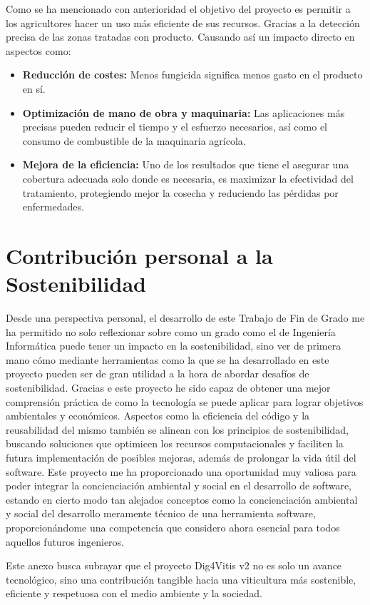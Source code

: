 Como se ha mencionado con anterioridad el objetivo del proyecto es permitir a los agricultores hacer un uso más eficiente de sus recursos. Gracias a la detección precisa de las zonas tratadas con producto.
Causando así un impacto directo en aspectos como:
\begin{itemize}
    \item \textbf{Reducción de costes:} Menos fungicida significa menos gasto en el producto en sí.
    \item \textbf{Optimización de mano de obra y maquinaria:} Las aplicaciones más precisas pueden reducir el tiempo y el esfuerzo necesarios, así como el consumo de combustible de la maquinaria agrícola.
    \item \textbf{Mejora de la eficiencia:} Uno de los resultados que tiene el asegurar una cobertura adecuada solo donde es necesaria, es maximizar la efectividad del tratamiento, protegiendo mejor la cosecha y reduciendo las pérdidas por enfermedades.
\end{itemize}

\section{Contribución personal a la Sostenibilidad}

Desde una perspectiva personal, el desarrollo de este Trabajo de Fin de Grado me ha permitido no solo reflexionar sobre como un grado como el de Ingeniería Informática puede tener un impacto en la sostenibilidad, sino ver de primera mano cómo mediante herramientas como la que se ha desarrollado en este proyecto pueden ser de gran utilidad a la hora de abordar desafíos de sostenibilidad. Gracias e este proyecto he sido capaz de obtener una mejor comprensión práctica de como la tecnología se puede aplicar para lograr objetivos ambientales y económicos.
Aspectos como la eficiencia del código y la reusabilidad del mismo también se alinean con los principios de sostenibilidad, buscando soluciones que optimicen los recursos computacionales y faciliten la futura implementación de posibles mejoras, además de prolongar la vida útil del software.
Este proyecto me ha proporcionado una oportunidad muy valiosa para poder integrar la concienciación ambiental y social en el desarrollo de software, estando en cierto modo tan alejados conceptos como la concienciación ambiental y social del desarrollo meramente técnico de una herramienta software, proporcionándome una competencia que considero ahora esencial para todos aquellos futuros ingenieros.

Este anexo busca subrayar que el proyecto Dig4Vitis v2 no es solo un avance tecnológico, sino una contribución tangible hacia una viticultura más sostenible, eficiente y respetuosa con el medio ambiente y la sociedad.
